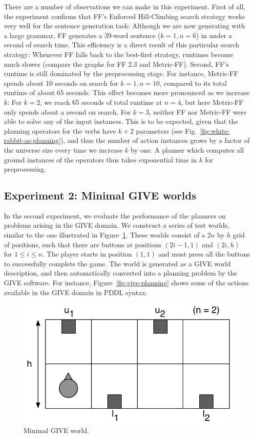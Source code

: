 There are a number of observations we can make in this
experiment. First of all, the experiment confirms that FF's Enforced
Hill-Climbing search strategy works very well for the sentence
generation task: Although we are now generating with a large grammar,
FF generates a 39-word sentence ($k=1,n=6$) in under a second of
search time. This efficiency is a direct result of this particular
search strategy: Whenever FF falls back to the best-first strategy,
runtimes become much slower (compare the graphs for FF 2.3 and
Metric-FF). Second, FF's runtime is still dominated by the
preprocessing stage. For instance, Metric-FF spends about 10 seconds
on search for $k=1,n=10$, compared to its total runtime of about 65
seconds. This effect becomes more pronounced as we increase $k$: For
$k=2$, we reach 65 seconds of total runtime at $n=4$, but here
Metric-FF only spends about a second on search. For $k=3$, neither FF
nor Metric-FF were able to solve any of the input
instances.  This is to be expected, given that the planning
operators for the verbs have $k+2$ parameters (see
Fig.~\ref{fig:white-rabbit-as-planning}), and thus the number of
action instances grows by a factor of the universe size every time we
increase $k$ by one. A planner which computes all ground instances of
the operators thus takes exponential time in $k$ for preprocessing.




\subsection{Experiment 2: Minimal GIVE worlds}
\label{sec:exper-2:-minim}

In the second experiment, we evaluate the performance of the planners on
problems arising in the GIVE domain. We construct a series of test worlds,
similar to the one illustrated in Figure~\ref{fig:give-minimal}. These
worlds consist of a $2n$ by $h$ grid of positions, such that there are
buttons at positions $(2i-1,1)$ and $(2i,h)$ for $1 \leq i \leq n$. The
player starts in position $(1,1)$ and must press all the buttons
to successfully complete the game. The world is generated as a GIVE world
description, and then automatically converted into a planning problem by
the GIVE software. For instance, Figure~\ref{fig:give-planning} shows some
of the actions available in the GIVE domain in PDDL syntax.

\begin{figure}[t]
  \centering
  \includegraphics[width=0.5\columnwidth]{pic-buttons}
  \caption{Minimal GIVE world.}
  \label{fig:give-minimal}
\end{figure}

